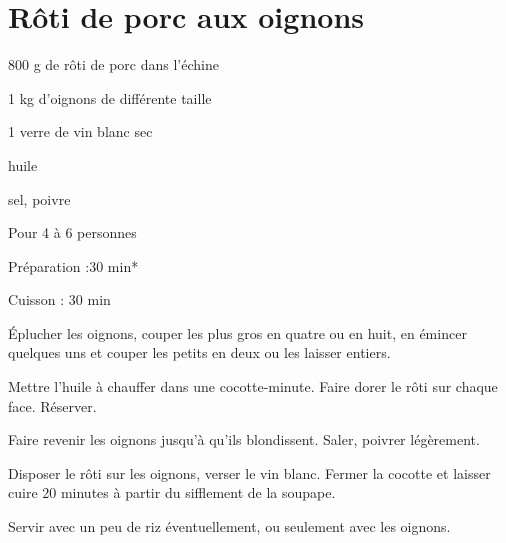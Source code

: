 \section[\normalsize{R\^oti de porc aux oignons miel}]{R\^oti de porc aux oignons}

\begin{ingredients}
\item 800 g de rôti de porc dans l'échine
\item 1 kg d'oignons de différente taille
\item 1 verre de vin blanc sec
\item huile
\item sel, poivre
\end{ingredients}
\begin{infos}
\item Pour 4 à 6 personnes
\item Préparation :30 min*
\item Cuisson : 30 min
\end{infos}
\begin{etapes}
\item Éplucher les oignons, couper les plus gros en quatre ou en huit, en émincer quelques uns et couper les petits en deux ou les laisser entiers.
\item Mettre l'huile à chauffer dans une cocotte-minute. Faire dorer le rôti sur chaque face. Réserver.
\item Faire revenir les oignons jusqu'à qu'ils blondissent. Saler, poivrer légèrement.
\item Disposer le rôti sur les oignons, verser le vin blanc. Fermer la cocotte et laisser cuire 20 minutes à partir du sifflement de la soupape.
\item Servir avec un peu de riz éventuellement, ou seulement avec les oignons.
\end{etapes}
\begin{conseils}
\end{conseils}